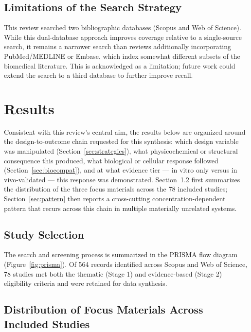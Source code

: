 \documentclass[5p,times,twocolumn]{elsarticle}
\begin{document}
\subsection{Limitations of the Search Strategy}

This review searched two bibliographic databases (Scopus and Web of Science). While this dual-database approach improves coverage relative to a single-source search, it remains a narrower search than reviews additionally incorporating PubMed/MEDLINE or Embase, which index somewhat different subsets of the biomedical literature. This is acknowledged as a limitation; future work could extend the search to a third database to further improve recall.

\section{Results}
\label{sec:results}

Consistent with this review's central aim, the results below are organized around the design-to-outcome chain requested for this synthesis: which design variable was manipulated (Section~\ref{sec:strategies}), what physicochemical or structural consequence this produced, what biological or cellular response followed (Section~\ref{sec:biocompat}), and at what evidence tier --- in vitro only versus in vivo-validated --- this response was demonstrated. Section~\ref{sec:materials} first summarizes the distribution of the three focus materials across the 78 included studies; Section~\ref{sec:pattern} then reports a cross-cutting concentration-dependent pattern that recurs across this chain in multiple materially unrelated systems.

\subsection{Study Selection}

The search and screening process is summarized in the PRISMA flow diagram (Figure~\ref{fig:prisma}). Of 564 records identified across Scopus and Web of Science, 78 studies met both the thematic (Stage 1) and evidence-based (Stage 2) eligibility criteria and were retained for data synthesis.

\subsection{Distribution of Focus Materials Across Included Studies}
\label{sec:materials}
\end{document}
